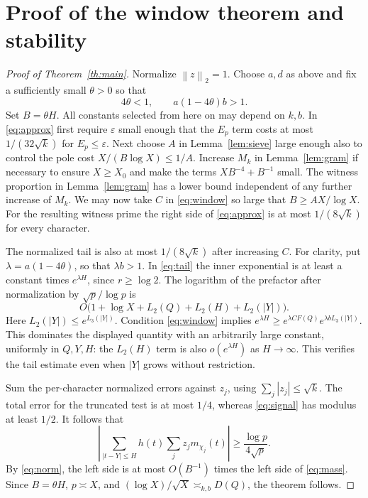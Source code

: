 \documentclass[11pt]{article}
\newcommand{\norm}[1]{\left\lVert #1\right\rVert}
\newcommand{\abs}[1]{\left\lvert #1\right\rvert}
\begin{document}
\section{Proof of the window theorem and stability}
\begin{proof}[Proof of Theorem~\ref{th:main}]
Normalize $\norm z_2=1$. Choose $a,d$ as above and fix a sufficiently small $\theta>0$ so that
\[
 4\theta<1,\qquad a(1-4\theta)b>1.
\]
Set $B=\theta H$. All constants selected from here on may depend on $k,b$. In \eqref{eq:approx} first require $\varepsilon$ small enough that the $E_p$ term costs at most $1/(32\sqrt k)$ for $E_p\le\varepsilon$. Next choose $A$ in Lemma~\ref{lem:sieve} large enough also to control the pole cost $X/(B\log X)\le1/A$. Increase $M_k$ in Lemma~\ref{lem:gram} if necessary to ensure $X\ge X_0$ and make the terms $XB^{-4}+B^{-1}$ small. The witness proportion in Lemma~\ref{lem:gram} has a lower bound independent of any further increase of $M_k$. We may now take $C$ in \eqref{eq:window} so large that $B\ge AX/\log X$. For the resulting witness prime the right side of \eqref{eq:approx} is at most $1/(8\sqrt k)$ for every character.

The normalized tail is also at most $1/(8\sqrt k)$ after increasing $C$. For clarity, put $\lambda=a(1-4\theta)$, so that $\lambda b>1$. In \eqref{eq:tail} the inner exponential is at least a constant times $e^{\lambda H}$, since $r\ge\log 2$. The logarithm of the prefactor after normalization by $\sqrt p/\log p$ is
\[
 O\big(1+\log X+L_2(Q)+L_2(H)+L_2(|Y|)\big).
\]
Here $L_2(|Y|)\le e^{L_3(|Y|)}$. Condition \eqref{eq:window} implies
$e^{\lambda H}\ge e^{\lambda C F(Q)}e^{\lambda b L_3(|Y|)}$. This dominates the displayed quantity with an arbitrarily large constant, uniformly in $Q,Y,H$: the $L_2(H)$ term is also $o(e^{\lambda H})$ as $H\to\infty$. This verifies the tail estimate even when $|Y|$ grows without restriction.

Sum the per-character normalized errors against $z_j$, using $\sum_j|z_j|\le\sqrt k$. The total error for the truncated test is at most $1/4$, whereas \eqref{eq:signal} has modulus at least $1/2$. It follows that
\begin{equation}\label{eq:separating}
 \abs{\sum_{|t-Y|\le H}h(t)\sum_j z_jm_{\chi_j}(t)}
 \ge \frac{\log p}{4\sqrt p}.
\end{equation}
By \eqref{eq:norm}, the left side is at most $O(B^{-1})$ times the left side of \eqref{eq:mass}. Since $B=\theta H$, $p\asymp X$, and $(\log X)/\sqrt X\asymp_{k,b}D(Q)$, the theorem follows.
\end{proof}
\end{document}
